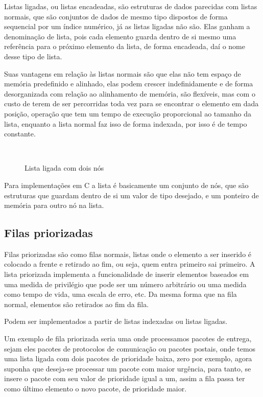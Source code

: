 Listas ligadas, ou listas encadeadas, são estruturas de dados parecidas com listas normais, que são conjuntos de dados de mesmo tipo dispostos de forma sequencial por um índice numérico, já as listas ligadas não são. Elas ganham a denominação de lista, pois cada elemento guarda dentro de si mesmo uma referência para o próximo elemento da lista, de forma encadeada, daí o nome desse tipo de lista. 

Suas vantagens em relação às listas normais são que elas não tem espaço de memória predefinido e alinhado, elas podem crescer indefinidamente e de forma desorganizada com relação ao alinhamento de memória, são flexíveis, mas com o custo de terem de ser percorridas toda vez para se encontrar o elemento em dada posição, operação que tem um tempo de execução proporcional ao tamanho da lista, enquanto a lista normal faz isso de forma indexada, por isso é de tempo constante.

\begin{figure}[ht]
	\centering
	\caption{Lista ligada com dois nós}
	\\
	\label{fig:linked}
\end{figure}

Para implementações em C a lista é basicamente um conjunto de nós, que são estruturas que guardam dentro de si um valor de tipo desejado, e um ponteiro de memória para outro nó na lista.

\subsection{Filas priorizadas}

Filas priorizadas são como filas normais, listas onde o elemento a ser inserido é colocado a frente e retirado ao fim, ou seja, quem entra primeiro sai primeiro. A lista priorizada implementa a funcionalidade de inserir elementos baseados em uma medida de privilégio que pode ser um número arbitrário ou uma medida como tempo de vida, uma escala de erro, etc. Da mesma forma que na fila normal, elementos são retirados ao fim da fila.

Podem ser implementados a partir de listas indexadas ou listas ligadas.

Um exemplo de fila priorizada seria uma onde processamos pacotes de entrega, sejam eles pacotes de protocolos de comunicação ou pacotes postais, onde temos uma lista ligada com dois pacotes de prioridade baixa, zero por exemplo, agora suponha que deseja-se processar um pacote com maior urgência, para tanto, se insere o pacote com seu valor de prioridade igual a um, assim a fila passa ter como último elemento o novo pacote, de prioridade maior.

